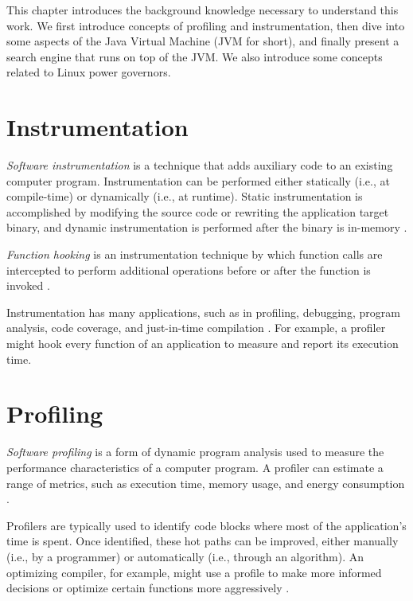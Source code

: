 \label{cap:background}

This chapter introduces the background knowledge necessary to understand this work. We first introduce concepts of profiling and instrumentation, then dive into some aspects of the Java Virtual Machine (JVM for short), and finally present a search engine that runs on top of the JVM. We also introduce some concepts related to Linux power governors.

\section{Instrumentation}

\emph{Software instrumentation} is a technique that adds auxiliary code to an existing computer program. Instrumentation can be performed either statically (i.e., at compile-time) or dynamically (i.e., at runtime). Static instrumentation is accomplished by modifying the source code or rewriting the application target binary, and dynamic instrumentation is performed after the binary is in-memory \cite{kempf2007instrumentation}.

\emph{Function hooking} is an instrumentation technique by which function calls are intercepted to perform additional operations before or after the function is invoked \cite{lopez2017survey}.

Instrumentation has many applications, such as in profiling, debugging, program analysis, code coverage, and just-in-time compilation \cite{graham1982gprof,zhao2008debug,seward2005memcheck,ivankovic2019googlecov,openjdktier}. For example, a profiler might hook every function of an application to measure and report its execution time.

\section{Profiling}

\emph{Software profiling} is a form of dynamic program analysis used to measure the performance characteristics of a computer program. A profiler can estimate a range of metrics, such as execution time, memory usage, and energy consumption \cite{graham1982gprof,reiss2009visualizing,pathak2012energy}.

Profilers are typically used to identify code blocks where most of the application's time is spent. Once identified, these hot paths can be improved, either manually (i.e., by a programmer) or automatically (i.e., through an algorithm). An optimizing compiler, for example, might use a profile to make more informed decisions or optimize certain functions more aggressively \cite{pettis1990guided}.

